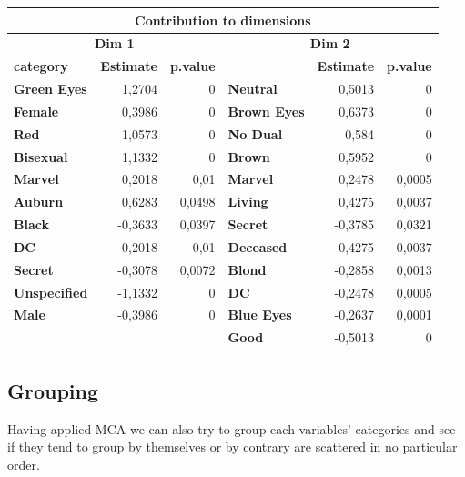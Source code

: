 \begin{center}
\begin{tabular*}{0.85\textwidth}{l@{\extracolsep{\fill}}rrlrr}
\multicolumn{6}{c}{\textbf{Contribution to dimensions}} \\ \hline
\multicolumn{3}{c}{\textbf{Dim 1}} & \multicolumn{3}{c}{\textbf{Dim 2}} \\ \hline
\textbf{category} & \textbf{Estimate} & \multicolumn{1}{r|}{\textbf{p.value}} & \textbf{} & \textbf{Estimate} & \textbf{p.value} \\ \hline
\textbf{Green Eyes} & 1,2704 & \multicolumn{1}{r|}{0} & \textbf{Neutral} & 0,5013 & 0 \\
\textbf{Female} & 0,3986 & \multicolumn{1}{r|}{0} & \textbf{Brown Eyes} & 0,6373 & 0 \\
\textbf{Red} & 1,0573 & \multicolumn{1}{r|}{0} & \textbf{No Dual} & 0,584 & 0 \\
\textbf{Bisexual} & 1,1332 & \multicolumn{1}{r|}{0} & \textbf{Brown} & 0,5952 & 0 \\
\textbf{Marvel} & 0,2018 & \multicolumn{1}{r|}{0,01} & \textbf{Marvel} & 0,2478 & 0,0005 \\
\textbf{Auburn} & 0,6283 & \multicolumn{1}{r|}{0,0498} & \textbf{Living} & 0,4275 & 0,0037 \\
\textbf{Black} & -0,3633 & \multicolumn{1}{r|}{0,0397} & \textbf{Secret} & -0,3785 & 0,0321 \\
\textbf{DC} & -0,2018 & \multicolumn{1}{r|}{0,01} & \textbf{Deceased} & -0,4275 & 0,0037 \\
\textbf{Secret} & -0,3078 & \multicolumn{1}{r|}{0,0072} & \textbf{Blond} & -0,2858 & 0,0013 \\
\textbf{Unspecified} & -1,1332 & \multicolumn{1}{r|}{0} & \textbf{DC} & -0,2478 & 0,0005 \\
\textbf{Male} & -0,3986 & \multicolumn{1}{r|}{0} & \textbf{Blue Eyes} & -0,2637 & 0,0001 \\
 &  & \multicolumn{1}{r|}{} & \textbf{Good} & -0,5013 & 0
\end{tabular*}
  
\end{center}


\subsection{Grouping}

Having applied MCA we can also try to group each variables' categories and see if they tend to group by themselves or by contrary are scattered in no particular order.

